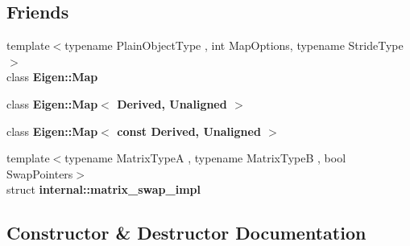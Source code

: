 \subsection*{Friends}
\begin{DoxyCompactItemize}
\item 
\mbox{\label{class_eigen_1_1_plain_object_base_a44523f8b49c90154f6195c6f04666499}} 
{\footnotesize template$<$typename Plain\+Object\+Type , int Map\+Options, typename Stride\+Type $>$ }\\class {\bfseries Eigen\+::\+Map}
\item 
\mbox{\label{class_eigen_1_1_plain_object_base_ade83ff019d359dc837c0f4b697eb5027}} 
class {\bfseries Eigen\+::\+Map$<$ Derived, Unaligned $>$}
\item 
\mbox{\label{class_eigen_1_1_plain_object_base_a52f7d6b523cce948a7804a7aeef210f9}} 
class {\bfseries Eigen\+::\+Map$<$ const Derived, Unaligned $>$}
\item 
\mbox{\label{class_eigen_1_1_plain_object_base_aab39995bda190be6874c21bc93040422}} 
{\footnotesize template$<$typename Matrix\+TypeA , typename Matrix\+TypeB , bool Swap\+Pointers$>$ }\\struct {\bfseries internal\+::matrix\+\_\+swap\+\_\+impl}
\end{DoxyCompactItemize}


\subsection{Constructor \& Destructor Documentation}
\mbox{\label{class_eigen_1_1_plain_object_base_a69656a28768b9b6f8b283e251d3552be}} 
